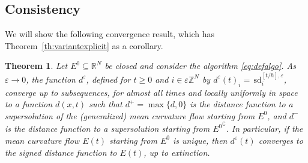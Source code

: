 \documentclass[10pt]{amsart}
\theoremstyle{plain}
\newtheorem{theorem}{Theorem}[section]
\theoremstyle{definition}
\newcommand{\R}{\mathbb{R}}
\newcommand{\Z}{\mathbb{Z}}
\newcommand{\comp}[1]{{#1}^\complement}
\newcommand{\e}{\varepsilon}
\newcommand{\sd}{\,\mathrm{sd}}
\numberwithin{equation}{section}
\begin{document}
\subsection{Consistency} \label{sec:proof}
We will show the following convergence result,
which has Theorem~\ref{th:variantexplicit} as a corollary.
\begin{theorem}\label{th:mainimplicit}
  Let $E^0\subseteq \R^N$   {be closed} and consider the algorithm \eqref{eq:defalgo}. As $\e\to 0$, the function $d^\e$, defined for $t\ge 0$ and $i\in\e\Z^N$
  by $d^\e(t)_i = \sd^{[t/h],\e}_i$, converge up to subsequences,
  for almost all times and locally uniformly in space to a function
  $d(x,t)$ such that $d^+=\max\{d,0\}$ is the distance function
  to a supersolution of the (generalized)
  mean curvature flow starting from $E^0$,
  and $d^-$ is the distance function to a supersolution starting from
  $\comp{E^0}$. In particular, if the mean curvature flow $E(t)$ starting
  from $E^0$ is unique, then $d^\e(t)$ converges to the signed distance
  function to $E(t)$, up to extinction.
\end{theorem}
\end{document}
